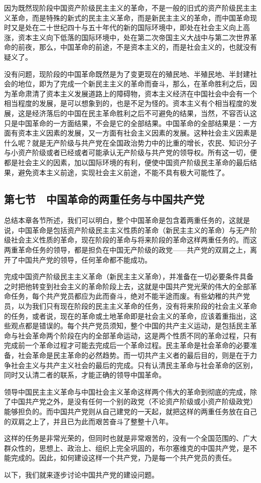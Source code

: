 因为既然现阶段中国资产阶级民主主义的革命，不是一般的旧式的资产阶级民主主义革命，而是特殊的新式的民主主义革命，而是新民主主义的革命，而中国革命现时又是处在二十世纪四十与五十年代的新的国际环境中，即处在社会主义向上高涨，资本主义向下低落的国际环境中，处在第二次帝国主义大战中与第二次世界革命的前夜，那么，中国革命的前途，不是资本主义的，而是社会主义的，也就没有疑义了。

没有问题，现阶段的中国革命既然是为了变更现在的殖民地、半殖民地、半封建社会的地位，即为了完成一个新民主主义的革命而奋斗，那么，在革命胜利之后，因为革命肃清了资本主义发展道路上的障碍物，资本主义经济在中国社会中会有一个相当程度的发展，是可以想象到的，也是不足为怪的。资本主义有个相当程度的发展，这是经济落后的中国在民主革命胜利之后不可避免的结果，当然，不容否认这只是中国革命的一方面结果，不会是它的全部结果。中国革命的全部结果是：一方面有资本主义因素的发展，又一方面有社会主义因素的发展。这种社会主义因素是什么呢？就是无产阶级与共产党在全国政治势力中的比重的增长，农民、知识分子与小资产阶级或者已经或者可能承认无产阶级与共产党的领导权。所有这一切，便都是社会主义的因素，加以国际环境的有利，便使中国资产阶级民主革命的最后结果，避免资本主义前途，实现社会主义前途，不能不具有极大可能性了。

\subsection{第七节　中国革命的两重任务与中国共产党}

总结本章各节所述，我们可以明白，整个中国革命是包含着两重任务的，这就是说，中国革命是包括资产阶级民主主义性质的革命（新民主主义的革命）与无产阶级社会主义性质的革命，现在阶段的革命与将来阶段的革命这样两重任务的。而这两重革命任务的领导，都是担负在中国无产阶级的政党——共产党的双肩之上，离开了中国共产党的领导，任何革命都不能成功。

完成中国资产阶级民主主义革命（新民主主义革命），并准备在一切必要条件具备之时把他转变到社会主义的革命阶段上去，这就是中国共产党光荣的伟大的全部革命任务，每个共产党员都应为此而奋斗，绝对不能半途而废。有些幼稚的共产党员，以为我们只有现在阶段的民主主义革命的任务，没有将来阶段的社会主义革命的任务，或者说，现在的革命或土地革命即是社会主义的革命，应该着重指出，这些观点都是错误的。每个共产党员须知，整个中国的共产主义运动，是包括民主革命与社会革命两个阶段在内的全部革命运动，这是两个性质不同的革命过程，只有完成前一个革命过程才可能去完成后一个革命过程。民主革命是社会革命的必要准备，社会革命是民主革命的必然趋势。而一切共产主义者的最后目的，则是在于力争社会主义与共产主义社会的最后的完成。只有认清民主革命与社会革命的区别，同时又认清二者的联系，才能正确的领导中国革命。

领导中国民主主义革命与中国社会主义革命这样两个伟大的革命到彻底的完成，除了中国共产党之外，是没有任何一个别的政党（不论资产阶级或小资产阶级政党）能够担负的。而中国共产党则从自己建党的一天起，就把这样的两重任务放在自己的双肩之上了，并且已为此而艰苦奋斗了整整十八年。

这样的任务是非常光荣的，但同时也就是非常艰苦的，没有一个全国范围的、广大群众性的，思想上、政治上、组织上完全巩固的，布尔塞维克的中国共产党，是不能完成的。因此，如何建设这样一个共产党，乃是每一个共产党员的责任。

以下，我们就来逐步讨论中国共产党的建设问题。
